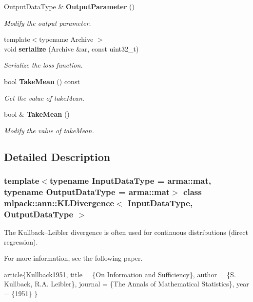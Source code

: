 \begin{DoxyCompactItemize}
Output\+Data\+Type \& \textbf{ Output\+Parameter} ()
\begin{DoxyCompactList}\small\item\em Modify the output parameter. \end{DoxyCompactList}\item 
{\footnotesize template$<$typename Archive $>$ }\\void \textbf{ serialize} (Archive \&ar, const uint32\+\_\+t)
\begin{DoxyCompactList}\small\item\em Serialize the loss function. \end{DoxyCompactList}\item 
bool \textbf{ Take\+Mean} () const
\begin{DoxyCompactList}\small\item\em Get the value of take\+Mean. \end{DoxyCompactList}\item 
bool \& \textbf{ Take\+Mean} ()
\begin{DoxyCompactList}\small\item\em Modify the value of take\+Mean. \end{DoxyCompactList}\end{DoxyCompactItemize}


\subsection{Detailed Description}
\subsubsection*{template$<$typename Input\+Data\+Type = arma\+::mat, typename Output\+Data\+Type = arma\+::mat$>$\newline
class mlpack\+::ann\+::\+K\+L\+Divergence$<$ Input\+Data\+Type, Output\+Data\+Type $>$}

The Kullback–\+Leibler divergence is often used for continuous distributions (direct regression). 

For more information, see the following paper.


\begin{DoxyCode}
article\{Kullback1951,
  title   = \{On Information and Sufficiency\},
  author  = \{S. Kullback, R.A. Leibler\},
  journal = \{The Annals of Mathematical Statistics\},
  year    = \{1951\}
\}
\end{DoxyCode}




